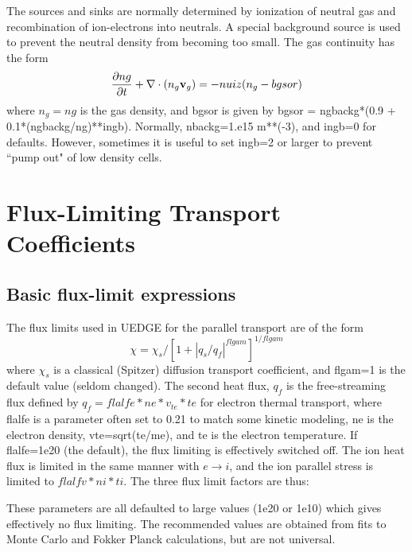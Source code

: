 \documentclass [12pt]{article}
\def\parder#1#2{{\partial#1\over\partial#2}}
\def\hsa{\hskip.4truein}
\def\hsp6{\hskip.6truein}
\begin{document}
   The sources and sinks are normally determined by ionization of neutral
gas and recombination of ion-electrons into neutrals. A special background
source is used to prevent the neutral density from becoming too small. The
gas continuity has the form
\begin{equation}
  \parder{ng}{t} + \nabla \cdot (n_g {\bf v}_g) = -nuiz (n_g -bgsor)
\end{equation}
where $n_g = ng$ is the gas density, and bgsor is given by bgsor =
ngbackg*(0.9 + 0.1*(ngbackg/ng)**ingb). Normally, nbackg=1.e15 m**(-3), and
ingb=0 for defaults. However, sometimes it is useful to set ingb=2 or larger
to prevent ``pump out" of low density cells.


\section{Flux-Limiting Transport Coefficients}
	      \subsection{Basic flux-limit expressions}
The flux limits used in {\sf UEDGE} for the parallel transport are of the form
\begin{equation}
   \chi =\chi_{s} / [1 + |q_s/q_f|^{flgam}]^{1/flgam}    
\end{equation}
where $\chi_s$ is a classical (Spitzer) diffusion transport coefficient, and
flgam=1 is the default value (seldom changed). The second heat flux, $q_f$ is
the free-streaming flux defined by $q_f = flalfe*ne*v_{te}*te$ for electron
thermal transport, where {\sf flalfe} is a parameter often set to 0.21 to
match some kinetic modeling, ne is the electron density, vte=sqrt(te/me), and
te is the electron temperature.  If {\sf flalfe=1e20} (the default), the flux
limiting is effectively switched off.  The ion heat flux is limited in the
same manner with $e \rightarrow i$, and the ion parallel stress is limited
to $flalfv*ni*ti$.  The three flux limit factors are thus: 
{\sf
{}
}
These parameters are all defaulted to large values (1e20 or 1e10) which gives
effectively no flux limiting. The recommended values are obtained from fits
to Monte Carlo and Fokker Planck calculations, but are not universal.
\end{document}
